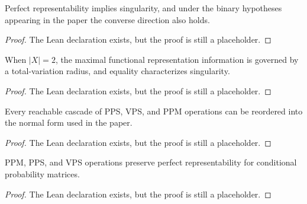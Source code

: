 \begin{lemma}
\label{lem:singularity}
Perfect representability implies singularity, and under the binary hypotheses appearing in the paper the converse direction also holds.
\end{lemma}

\begin{proof}
\notready
{}
The Lean declaration exists, but the proof is still a placeholder.
\end{proof}

\begin{lemma}
\label{lem:total-variation}
When $|X| = 2$, the maximal functional representation information is governed by a total-variation radius, and equality characterizes singularity.
\end{lemma}

\begin{proof}
\notready
{}
The Lean declaration exists, but the proof is still a placeholder.
\end{proof}

\begin{lemma}
\label{lem:reordering}
Every reachable cascade of PPS, VPS, and PPM operations can be reordered into the normal form used in the paper.
\end{lemma}

\begin{proof}
\notready
{}
The Lean declaration exists, but the proof is still a placeholder.
\end{proof}

\begin{lemma}
\label{lem:preserve-repr}
PPM, PPS, and VPS operations preserve perfect representability for conditional probability matrices.
\end{lemma}

\begin{proof}
\notready
{}
The Lean declaration exists, but the proof is still a placeholder.
\end{proof}

